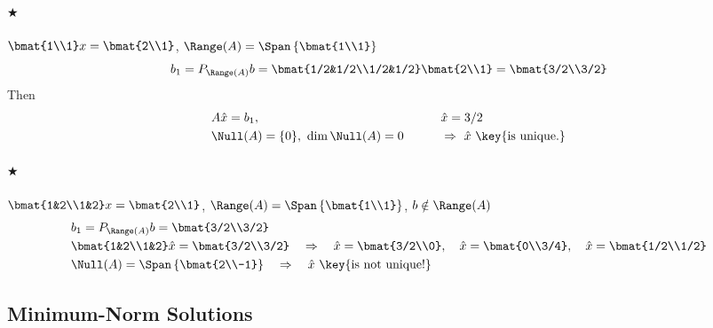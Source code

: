 \paragraph{$\bigstar$} $\displaystyle \bmat{1\\1}x = \bmat{2\\1}$, \qquad
$\Range(A) = \Span\left\{\bmat{1\\1}\right\}$
\[
b_1 = P_{\Range(A)}b = \bmat{1/2&1/2\\1/2&1/2}\bmat{2\\1} = \bmat{3/2\\3/2}
\]
Then
\begin{alignat*}{2}
&A\hat x = b_1, &\qquad& \hat x = 3/2\\
&\Null(A) = \{0\},\ \dim\Null(A) = 0 &\qquad& \Rightarrow\ \hat x \text{ \key{is unique.}}
\end{alignat*}

\paragraph{$\bigstar$} $\displaystyle \bmat{1&2\\1&2}x = \bmat{2\\1}$, \qquad
$\Range(A) = \Span\left\{\bmat{1\\1}\right\}$, \qquad $b\notin\Range(A)$
\begin{align*}
&b_1 = P_{\Range(A)}b = \bmat{3/2\\3/2}\\
&\bmat{1&2\\1&2}\hat x = \bmat{3/2\\3/2}
\quad\Rightarrow\quad \hat x = \bmat{3/2\\0}, \quad \hat x = \bmat{0\\3/4}, \quad \hat x = \bmat{1/2\\1/2}\\
&\Null(A) = \Span\left\{\bmat{2\\-1}\right\}
\quad\Rightarrow\quad \hat x \text{ \key{is not unique!}}
\end{align*}

\subsection{Minimum-Norm Solutions}\label{ss:min-norm}
